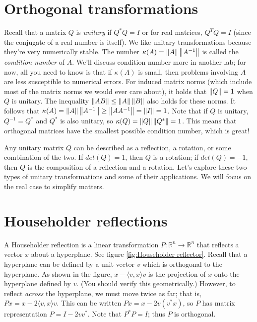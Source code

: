 \label{lab:Canonical Transformations}


\section*{Orthogonal transformations}
Recall that a matrix $Q$ is \emph{unitary} if $Q^* Q = I$ or for real matrices, 
$Q^T Q = I$ (since the conjugate of a real number is itself). 
We like unitary transformations because they're very numerically stable. 
The number $\kappa(A) = \left\lVert A\right\rVert \left\lVert A^{-1}\right\rVert$ is called the \emph{condition number} of $A$. 
We'll discuss condition number more in another lab; for now, all you need to know is that if $\kappa(A)$ is small, then problems involving $A$ are less susceptible to numerical errors. 
For induced matrix norms (which include most of the matrix norms we would ever care about), it holds that $\left\lVert Q\right\rVert=1$ when $Q$ is unitary. 
The inequality $\left\lVert AB\right\rVert \leq \left\lVert A\right\rVert \left\lVert B\right\rVert$ also holds for these norms. 
It follows that $\kappa(A) = \left\lVert A\right\rVert \left\lVert A^{-1}\right\rVert \geq \left\lVert A A^{-1}\right\rVert = \left\lVert I\right\rVert = 1$.
Note that if $Q$ is unitary, $Q^{-1} = Q^*$ and $Q^*$ is also unitary, so $\kappa(Q) = \left\lVert Q\right\rVert \left\lVert Q^*\right\rVert = 1$. 
This means that orthogonal matrices have the smallest possible condition number, which is great!

Any unitary matrix $Q$ can be described as a reflection, a rotation, or some combination of the two. 
If $det(Q) = 1$, then $Q$ is a rotation; if $det(Q) = -1$, then $Q$  is the composition of a reflection and a rotation.
Let's explore these two types of unitary transformations and some of their applications.
We will focus on the real case to simplify matters.

\section*{Householder reflections}
A Householder reflection is a linear transformation $P: \mathbb{R}^n \rightarrow \mathbb{R}^n$ that reflects a vector $x$ about a hyperplane. 
See figure \ref{fig:Householder reflector}. Recall that a hyperplane can be defined by a unit vector $v$ which is orthogonal to the hyperplane.
As shown in the figure, $x - \langle v,x \rangle v$ is the projection of $x$ onto the hyperplane defined by $v$.
(You should verify this geometrically.) However, to reflect \emph{across} the hyperplane, we must move twice as far; that is, $Px = x - 2\langle v,x \rangle v$. 
This can be written $Px = x - 2v(v^\ast x)$, so $P$ has matrix representation $P = I - 2vv^\ast$. Note that $P^\ast P = I$; thus $P$ is orthogonal.

